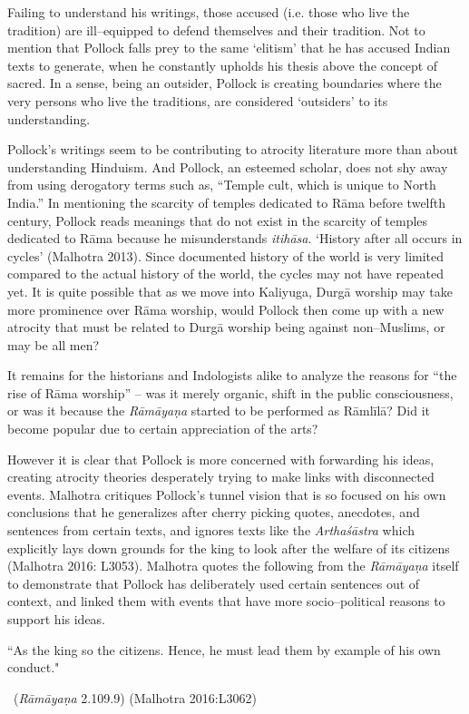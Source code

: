 Failing to understand his writings, those accused (i.e. those who live the tradition) are ill–equipped to defend themselves and their tradition. Not to mention that Pollock falls prey to the same ‘elitism’ that he has accused Indian texts to generate, when he constantly upholds his thesis above the concept of sacred. In a sense, being an outsider, Pollock is creating boundaries where the very persons who live the traditions, are considered ‘outsiders’ to its understanding.

Pollock’s writings seem to be contributing to atrocity literature more than about understanding Hinduism. And Pollock, an esteemed scholar, does not shy away from using derogatory terms such as, “Temple cult, which is unique to North India.” In mentioning the scarcity of temples dedicated to Rāma before twelfth century, Pollock reads meanings that do not exist in the scarcity of temples dedicated to Rāma because he misunderstands \textit{itihāsa}. ‘History after all occurs in cycles’ (Malhotra 2013). Since documented history of the world is very limited compared to the actual history of the world, the cycles may not have repeated yet. It is quite possible that as we move into Kaliyuga, Durgā worship may take more prominence over Rāma worship, would Pollock then come up with a new atrocity that must be related to Durgā worship being against non–Muslims, or may be all men?

It remains for the historians and Indologists alike to analyze the reasons for “the rise of Rāma worship” – was it merely organic, shift in the public consciousness, or was it because the \textit{Rāmāyaṇa} started to be performed as Rāmlīlā? Did it become popular due to certain appreciation of the arts?

However it is clear that Pollock is more concerned with forwarding his ideas, creating atrocity theories desperately trying to make links with disconnected events. Malhotra critiques Pollock’s tunnel vision that is so focused on his own conclusions that he generalizes after cherry picking quotes, anecdotes, and sentences from certain texts, and ignores texts like the \textit{Arthaśāstra} which explicitly lays down grounds for the king to look after the welfare of its citizens (Malhotra 2016: L3053). Malhotra quotes the following from the \textit{Rāmāyaṇa} itself to demonstrate that Pollock has deliberately used certain sentences out of context, and linked them with events that have more socio–political reasons to support his ideas.

\begin{myquote}
“As the king so the citizens. Hence, he must lead them by example of his own conduct." 

~\hfill (\textit{Rāmāyaṇa} 2.109.9) (Malhotra 2016:L3062)
\end{myquote}


